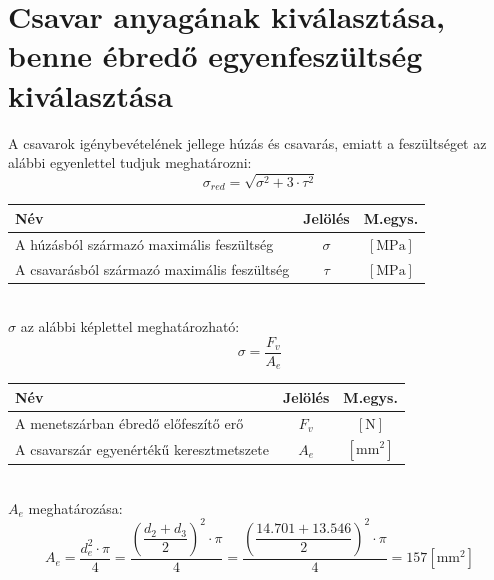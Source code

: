 \documentclass[10pt, a4paper]{article}
\newcommand{\n}{\mathrm{\left[N\right]}}
\newcommand{\mpa}{\mathrm{\left[MPa\right]}}
\newcommand{\mmn}{\mathrm{\left[mm^2\right]}}
\begin{document}
	\section{Csavar anyagának kiválasztása, benne ébredő egyenfeszültség kiválasztása}
	A csavarok igénybevételének jellege húzás és csavarás, emiatt a feszültséget az alábbi egyenlettel tudjuk meghatározni:
	\begin{equation}
		\sigma_{red} = \sqrt{\sigma^2 + 3 \cdot \tau^2} \tag{6}
	\end{equation}
		\vspace{-20pt}
			\renewcommand{\arraystretch}{1.4}
								\begin{table}[!h]
									\centering
									\begin{tabular}{l|c|c}
										\textbf{Név}                              & \textbf{Jelölés} & \textbf{M.egys.} \\ \hline
										A húzásból származó maximális feszültség                     & $\sigma$                & $\mpa$          \\
										A csavarásból származó maximális feszültség          & $\tau$                & $\mpa$			 	 	       
									\end{tabular}
								\end{table}
			\renewcommand{\arraystretch}{1}\\
	$\sigma$ az alábbi képlettel meghatározható:
	\begin{equation}
		\sigma = \dfrac{F_v}{A_e} \tag{6.1}
	\end{equation}
			\vspace{-20pt}
				\renewcommand{\arraystretch}{1.4}
									\begin{table}[!h]
										\centering
										\begin{tabular}{l|c|c}
											\textbf{Név}                              & \textbf{Jelölés} & \textbf{M.egys.} \\ \hline
											A menetszárban ébredő előfeszítő erő                      & $F_v$                & $\n$          \\
											A csavarszár egyenértékű keresztmetszete          & $A_e$                & $\mmn$			 	 	       
										\end{tabular}
									\end{table}
				\renewcommand{\arraystretch}{1}\\
	$A_e$ meghatározása:
	\begin{equation}
		A_e = \dfrac{d_e^2 \cdot \pi}{4} = \dfrac{\left(\dfrac{d_2 + d_3}{2}\right)^2 \cdot \pi}{4} = \dfrac{\left(\dfrac{14.701 + 13.546}{2}\right)^2 \cdot \pi}{4} = 157 \mmn\tag{6.1.1}
	\end{equation}
\end{document}

